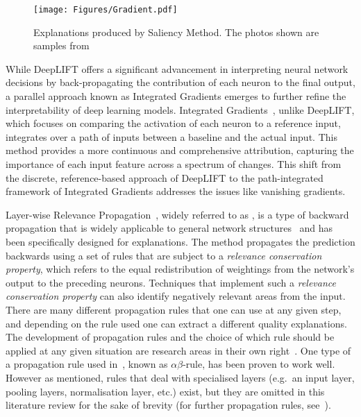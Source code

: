 \begin{figure}[ht!]
	\begin{center}
		\texttt{[image: Figures/Gradient.pdf]}
	\end{center}
	\caption{Explanations produced by Saliency Method. The photos shown are samples from~\cite{SimonyanVZ13}}
	\label{Fig:Saliency_Method}
\end{figure} 


While DeepLIFT offers a significant advancement in interpreting neural network decisions by back-propagating the contribution of each neuron to the final output, a parallel approach known as Integrated Gradients emerges to further refine the interpretability of deep learning models. Integrated Gradients~\cite{SundararajanTY17}, unlike DeepLIFT, which focuses on comparing the activation of each neuron to a reference input, integrates over a path of inputs between a baseline and the actual input. This method provides a more continuous and comprehensive attribution, capturing the importance of each input feature across a spectrum of changes. This shift from the discrete, reference-based approach of DeepLIFT to the path-integrated framework of Integrated Gradients addresses the issues like vanishing gradients.

Layer-wise Relevance Propagation~\cite{bach2015pixel}, widely referred to as \LRP, is a type of backward propagation that is widely applicable to general network structures~\cite{LapuschkinBMMS16} and has been specifically designed for explanations. The method propagates the prediction backwards using a set of rules that are subject to a \textit{relevance conservation property}, which refers to the equal redistribution of weightings from the network's output to the preceding neurons. Techniques that implement such a \textit{relevance conservation property} can also identify negatively relevant areas from the input. There are many different \LRP\/ propagation rules that one can use at any given step, and depending on the rule used one can extract a different quality explanations. The development of propagation rules and the choice of which rule should be applied at any given situation are research areas in their own right~\cite{MontavonLBSM17}. One type of a \LRP\/ propagation rule used in~\cite{bach2015pixel}, known as $\alpha\beta$-rule, has been proven to work well. However as mentioned, rules that deal with specialised layers (e.g.\ an input layer, pooling layers, normalisation layer, etc.) exist, but they are omitted in this literature review for the sake of brevity (for further propagation rules, see~\cite{MontavonLBSM17}).


